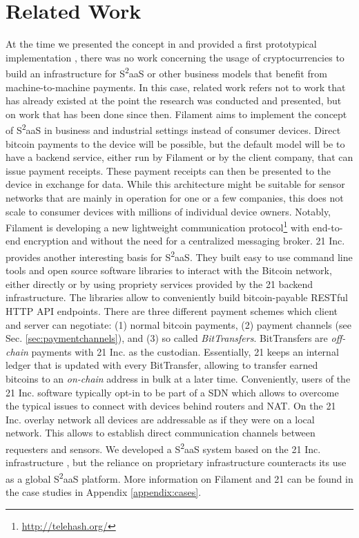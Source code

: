\section{Related Work}
\label{sec:s2aas_relatedwork}

At the time we presented the concept in \parencite{DBLP:journals/corr/NoyenVWF14} and provided a first prototypical implementation \parencite{Worner:2014:YSE:2638728.2638786}, there was no work concerning the usage of cryptocurrencies to build an infrastructure for S\textsuperscript{2}aaS or other business models that benefit from machine-to-machine payments.
In this case, related work refers not to work that has already existed at the point the research was conducted and presented, but on work that has been done since then. 
Filament aims to implement the concept of S\textsuperscript{2}aaS in business and industrial settings instead of consumer devices. Direct bitcoin payments to the device will be possible, but the default model will be to have a backend service, either run by Filament or by the client company, that can issue payment receipts. These payment receipts can then be presented to the device in exchange for data. While this architecture might be suitable for sensor networks that are mainly in operation for one or a few companies, this does not scale to consumer devices with millions of individual device owners. Notably, Filament is developing a new lightweight communication protocol\footnote{\url{http://telehash.org/}} with end-to-end encryption and without the need for a centralized messaging broker. 21 Inc. provides another interesting basis for S\textsuperscript{2}aaS. They built easy to use command line tools and open source software libraries to interact with the Bitcoin network, either directly or by using propriety services provided by the 21 backend infrastructure. The libraries allow to conveniently build bitcoin-payable \ac{REST}ful \ac{HTTP} \ac{API} endpoints. There are three different payment schemes which client and server can negotiate: (1) normal bitcoin payments, (2) payment channels (see Sec. \ref{sec:paymentchannels}), and (3) so called \emph{BitTransfers}. BitTransfers are \emph{off-chain} payments with 21 Inc. as the custodian. Essentially, 21 keeps an internal ledger that is updated with every BitTransfer, allowing to transfer earned bitcoins to an \emph{on-chain} address in bulk at a later time. Conveniently, users of the 21 Inc. software typically opt-in to be part of a \ac{SDN} which allows to overcome the typical issues to connect with devices behind routers and \ac{NAT}. On the 21 Inc. overlay network all devices are addressable as if they were on a local network. This allows to establish direct communication channels between requesters and sensors. We developed a S\textsuperscript{2}aaS system based on the 21 Inc. infrastructure \parencite{worner2016design}, but the reliance on proprietary infrastructure counteracts its use as a global S\textsuperscript{2}aaS platform. More information on Filament and 21 can be found in the case studies in Appendix \ref{appendix:cases}.

